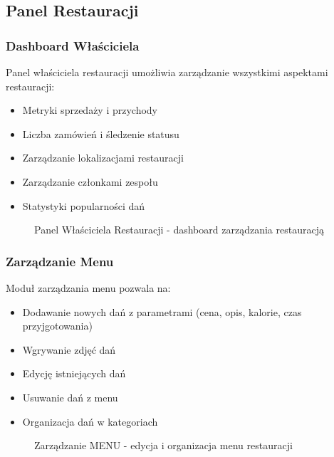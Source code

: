\documentclass[12pt,a4paper,utf-8]{article}
\begin{document}
\subsection{Panel Restauracji}

\subsubsection{Dashboard Właściciela}

Panel właściciela restauracji umożliwia zarządzanie wszystkimi aspektami restauracji:

\begin{itemize}
    \item Metryki sprzedaży i przychody
    \item Liczba zamówień i śledzenie statusu
    \item Zarządzanie lokalizacjami restauracji
    \item Zarządzanie członkami zespołu
    \item Statystyki popularności dań
\end{itemize}

\begin{figure}[H]
    \centering
    \caption{Panel Właściciela Restauracji  -  dashboard zarządzania restauracją}
    \label{fig:owner_dashboard}
\end{figure}

\subsubsection{Zarządzanie Menu}

Moduł zarządzania menu pozwala na:

\begin{itemize}
    \item Dodawanie nowych dań z parametrami (cena, opis, kalorie, czas przyjgotowania)
    \item Wgrywanie zdjęć dań
    \item Edycję istniejących dań
    \item Usuwanie dań z menu
    \item Organizacja dań w kategoriach
\end{itemize}

\begin{figure}[H]
    \centering
    \caption{Zarządzanie MENU  -  edycja i organizacja menu restauracji}
    \label{fig:menu_management}
\end{figure}
\end{document}
